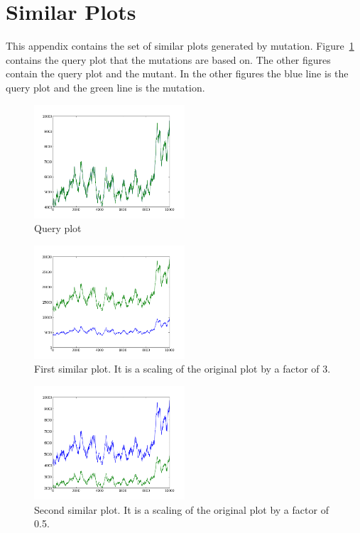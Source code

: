 \clearpage

\section{Similar Plots}
\label{sec:mutants}

This appendix contains the set of similar plots generated by mutation.  Figure~\ref{fig:query} contains the query plot that the mutations are based on.  The other figures contain the query plot and the mutant.  In the other figures the blue line is the query plot and the green line is the mutation.

\begin{figure}[h!]
    \centering
    \includegraphics[width=0.5\textwidth]{images/query.png}
    \caption{Query plot}
    \label{fig:query}
\end{figure}

\begin{figure}[h!]
    \centering
    \includegraphics[width=0.5\textwidth]{images/mutant_1.png}
    \caption{First similar plot.  It is a scaling of the original plot by a factor of 3.}
    \label{fig:mutant_1}
\end{figure}

\begin{figure}[h!]
    \centering
    \includegraphics[width=0.5\textwidth]{images/mutant_2.png}
    \caption{Second similar plot.  It is a scaling of the original plot by a factor of 0.5.}
    \label{fig:mutant_2}
\end{figure}

